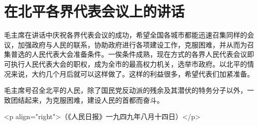 \section[在北平各界代表会议上的讲话（一九四九年八月十三日）]{在北平各界代表会议上的讲话}


毛主席在讲话中庆祝各界代表会议的成功，希望全国各城市都能迅速召集同样的会议，加强政府与人民的联系，协助政府进行各项建设工作，克服困难，并从而为召集普选的人民代表大会准备条件。一俟条件成熟，现在方式的各界人民代表会议即可执行人民代表大会的职权，成为全市的最高权力机关，选举市政府。以北平的情况来说，大约几个月后就可以这样做了。这样的利益很多，希望代表们加紧准备。

毛主席号召全北平的人民，除了国民党反动派的残余及其潜伏的特务分子以外，一致团结起来，为克服困难，建设人民的首都而奋斗。

<p align="right">（《人民日报》一九四九年八月十四日）</p>




